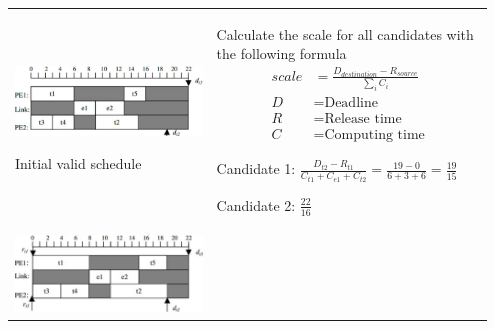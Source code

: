 \begin{longtable}{p{0.4\linewidth}p{0.55\linewidth}}
			\vspace{0pt}
			
			\includegraphics[scale=0.26]{./pictures/voltage_scheduling_1.png}
			
			Initial valid schedule
			& 		
				\begin{compactenum}
					\setcounter{enumi}{1}
					\item Calculate the scale for all candidates with the following formula
					\begin{equation*}
						\begin{aligned}
							scale&=\frac{D_{destination}-R_{source}}{\sum_{i}C_i} \\
							D &= \text{Deadline} \\
							R &= \text{Release time} \\
							C &= \text{Computing time}
						\end{aligned}
					\end{equation*}
					\begin{compactitem}
						\item Candidate 1: $\frac{D_{t2}-R_{t1}}{C_{t1}+C_{e1}+C_{t2}}=\frac{19-0}{6+3+6}=\frac{19}{15}$
						\item Candidate 2: $\frac{22}{16}$
					\end{compactitem}
				\end{compactenum}\\[-\normalbaselineskip]
				
			\vspace{0pt}
			
			\includegraphics[scale=0.35]{./pictures/voltage_scheduling_2.png}
			

\end{longtable}
